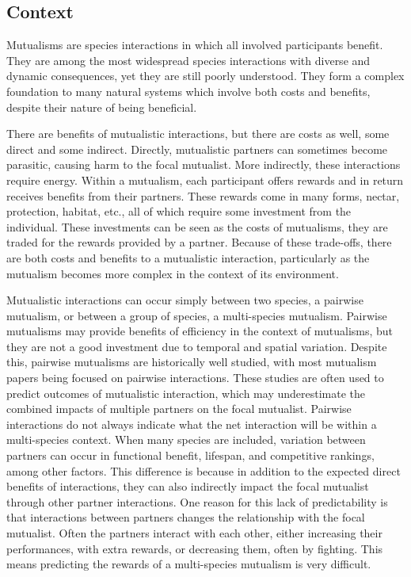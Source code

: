 \documentclass[12pt,a4paper]{article}
\begin{document}
\subsection*{Context}

Mutualisms are species interactions in which all involved participants benefit. They are among the most widespread species interactions\cite{Chamberlain2014,Stachowicz2005,BoucherDouglasH.1985} with diverse and dynamic consequences, yet they are still poorly understood. They form a complex foundation to many natural systems which involve both costs and benefits, despite their nature of being beneficial. 

There are benefits of mutualistic interactions, but there are costs as well, some direct and some indirect. Directly, mutualistic partners can sometimes become parasitic, causing harm to the focal mutualist\cite{Bronstein2001a}. More indirectly, these interactions require energy. Within a mutualism, each participant offers rewards and in return receives benefits from their partners. These rewards come in many forms, nectar, protection, habitat, etc., all of which require some investment from the individual\cite{Bronstein2001}. These investments can be seen as the costs of mutualisms, they are traded for the rewards provided by a partner. Because of these trade-offs, there are both costs and benefits to a mutualistic interaction\cite{Bronstein2001,Bronstein2001a}, particularly as the mutualism becomes more complex in the context of its environment. 

Mutualistic interactions can occur simply between two species, a pairwise mutualism, or between a group of species, a multi-species mutualism\cite{Stanton2013}. Pairwise mutualisms may provide benefits of efficiency in the context of mutualisms, but they are not a good investment due to temporal and spatial variation\cite{Waser1996}. Despite this, pairwise mutualisms are historically well studied, with most mutualism papers being focused on pairwise interactions. These studies are often used to predict outcomes of mutualistic interaction, which may underestimate the combined impacts of multiple partners on the focal mutualist\cite{Stanton2013,Palmer2010}. Pairwise interactions do not always indicate what the net interaction will be within a multi-species context\cite{Chamberlain2014,Song2020}. When many species are included, variation between partners can occur in functional benefit, lifespan, and competitive rankings, among other factors\cite{Stanton2013}. This difference is because in addition to the expected direct benefits of interactions, they can also indirectly impact the focal mutualist through other partner interactions. One reason for this lack of predictability is that interactions between partners changes the relationship with the focal mutualist\cite{Afkhami2014}.  Often the partners interact with each other, either increasing their performances, with extra rewards, or decreasing them, often by fighting\cite{Boucher1982}. This means predicting the rewards of a multi-species mutualism is very difficult. 
\end{document}
